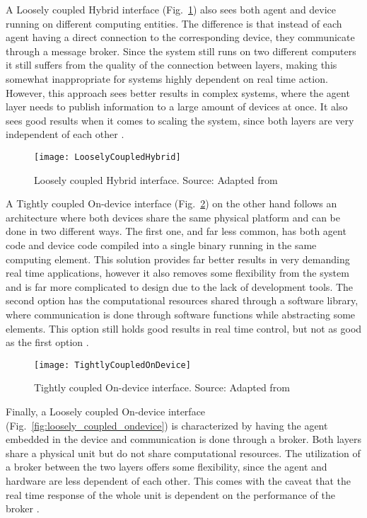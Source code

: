 A Loosely coupled Hybrid interface (Fig.~\ref{fig:loosely_coupled_hybrid}) also sees both agent and device running on different computing entities. The difference is that instead of each agent having a direct connection to the corresponding device, they communicate through a message broker. Since the system still runs on two different computers it still suffers from the quality of the connection between layers, making this somewhat inappropriate for systems highly dependent on real time action. However, this approach sees better results in complex systems, where the agent layer needs to publish information to a large amount of devices at once. It also sees good results when it comes to scaling the system, since both layers are very independent of each other \cite{8591641}.\\

\begin{figure}[h!]
	\centering
	\texttt{[image: LooselyCoupledHybrid]}
	\caption{Loosely coupled Hybrid interface. Source: Adapted from \cite{8591641}}
	\label{fig:loosely_coupled_hybrid}
\end{figure}

A Tightly coupled On-device interface (Fig.~\ref{fig:tightly_coupled_ondevice}) on the other hand follows an architecture where both devices share the same physical platform and can be done in two different ways. The first one, and far less common, has both agent code and device code compiled into a single binary running in the same computing element. This solution provides far better results in very demanding real time applications, however it also removes some flexibility from the system and is far more complicated to design due to the lack of development tools. The second option has the computational resources shared through a software library, where communication is done through software functions while abstracting some elements. This option still holds good results in real time control, but not as good as the first option \cite{8591641}.\\

\begin{figure}[H]
	\centering
	\texttt{[image: TightlyCoupledOnDevice]}
	\caption{Tightly coupled On-device interface. Source: Adapted from \cite{8591641}}
	\label{fig:tightly_coupled_ondevice}
\end{figure}

Finally, a Loosely coupled On-device interface (Fig.~\ref{fig:loosely_coupled_ondevice}) is characterized by having the agent embedded in the device and communication is done through a broker. Both layers share a physical unit but do not share computational resources. The utilization of a broker between the two layers offers some flexibility, since the agent and hardware are less dependent of each other. This comes with the caveat that the real time response of the whole unit is dependent on the performance of the broker \cite{8591641}.\\

